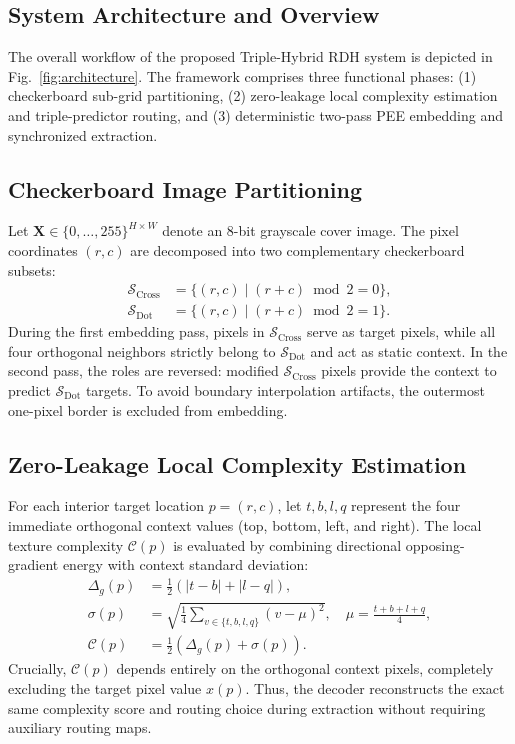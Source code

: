 \documentclass[conference]{IEEEtran}
\begin{document}
\subsection{System Architecture and Overview}
The overall workflow of the proposed Triple-Hybrid RDH system is depicted in Fig.~\ref{fig:architecture}. The framework comprises three functional phases: (1) checkerboard sub-grid partitioning, (2) zero-leakage local complexity estimation and triple-predictor routing, and (3) deterministic two-pass PEE embedding and synchronized extraction.

\subsection{Checkerboard Image Partitioning}
Let $\mathbf{X} \in \{0, \dots, 255\}^{H \times W}$ denote an 8-bit grayscale cover image. The pixel coordinates $(r, c)$ are decomposed into two complementary checkerboard subsets:
\begin{align}
\mathcal{S}_{\mathrm{Cross}} &= \{(r, c) \mid (r + c) \bmod 2 = 0\}, \\
\mathcal{S}_{\mathrm{Dot}} &= \{(r, c) \mid (r + c) \bmod 2 = 1\}.
\end{align}
During the first embedding pass, pixels in $\mathcal{S}_{\mathrm{Cross}}$ serve as target pixels, while all four orthogonal neighbors strictly belong to $\mathcal{S}_{\mathrm{Dot}}$ and act as static context. In the second pass, the roles are reversed: modified $\mathcal{S}_{\mathrm{Cross}}$ pixels provide the context to predict $\mathcal{S}_{\mathrm{Dot}}$ targets. To avoid boundary interpolation artifacts, the outermost one-pixel border is excluded from embedding.

\subsection{Zero-Leakage Local Complexity Estimation}
\label{subsec:complexity}
For each interior target location $p=(r,c)$, let $t, b, l, q$ represent the four immediate orthogonal context values (top, bottom, left, and right). The local texture complexity $\mathcal{C}(p)$ is evaluated by combining directional opposing-gradient energy with context standard deviation:
\begin{equation}
\begin{aligned}
\Delta_g(p) &= \frac{1}{2}\left(|t - b| + |l - q|\right), \\
\sigma(p) &= \sqrt{\frac{1}{4}\sum_{v \in \{t,b,l,q\}} (v - \mu)^2}, \quad \mu = \frac{t+b+l+q}{4}, \\
\mathcal{C}(p) &= \frac{1}{2}\left(\Delta_g(p) + \sigma(p)\right).
\end{aligned}
\label{eq:complexity}
\end{equation}
Crucially, $\mathcal{C}(p)$ depends entirely on the orthogonal context pixels, completely excluding the target pixel value $x(p)$. Thus, the decoder reconstructs the exact same complexity score and routing choice during extraction without requiring auxiliary routing maps.
\end{document}
